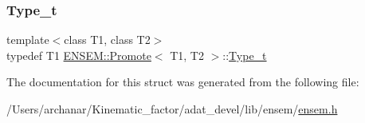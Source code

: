 \subsubsection{\texorpdfstring{Type\_t}{Type\_t}\hspace{0.1cm}{\footnotesize\ttfamily [2/2]}}
{\footnotesize\ttfamily template$<$class T1, class T2$>$ \\
typedef T1 \mbox{\hyperlink{structENSEM_1_1Promote}{E\+N\+S\+E\+M\+::\+Promote}}$<$ T1, T2 $>$\+::\mbox{\hyperlink{structENSEM_1_1Promote_a6a7260634b484365b9d70ccf3c0fd6fd}{Type\+\_\+t}}}



The documentation for this struct was generated from the following file\+:\begin{DoxyCompactItemize}
\item 
/\+Users/archanar/\+Kinematic\+\_\+factor/adat\+\_\+devel/lib/ensem/\mbox{\hyperlink{lib_2ensem_2ensem_8h}{ensem.\+h}}\end{DoxyCompactItemize}
